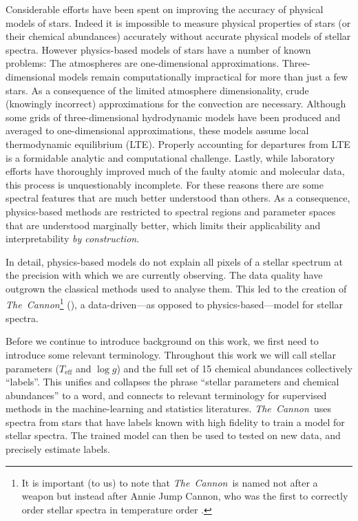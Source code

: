 \documentclass[12pt,preprint]{aastex}
\newcommand{\project}[1]{\textsl{#1}}
\newcommand{\TheCannon}{\project{The~Cannon}}
\newcommand{\logg}{\log g}
\newcommand{\Teff}{T_{\mathrm{eff}}}
\begin{document}
Considerable efforts have  been spent on improving the accuracy of physical
models of stars.  Indeed it is impossible to measure physical properties of stars (or 
their chemical abundances) accurately without accurate physical models of 
stellar spectra.  However physics-based models of stars have a number of known
problems:  The atmospheres are one-dimensional approximations.  
Three-dimensional models remain computationally impractical for more than just a
few stars.  As a consequence of the limited atmosphere dimensionality, crude 
(knowingly incorrect) approximations for the convection are 
necessary.  Although some grids of three-dimensional hydrodynamic models have been 
produced and averaged to one-dimensional approximations, these models assume 
local thermodynamic equilibrium (LTE).  Properly accounting for departures from 
LTE is a formidable analytic and computational challenge.  Lastly, while 
laboratory efforts have thoroughly improved much of the faulty atomic and 
molecular data, this process is unquestionably incomplete.  For these reasons 
there are some spectral features that are much better understood than others.  
As a consequence, physics-based methods are restricted to spectral regions and
parameter spaces that are understood marginally better, which limits 
their applicability and interpretability \emph{by construction}.


In detail, physics-based models do not explain all pixels of a stellar 
spectrum at the precision with which we are currently observing.  The data
quality have outgrown the classical methods used to analyse them.  This led to the creation of
\TheCannon\footnote{It is important (to us) to note that \TheCannon\ is named 
not after a weapon but instead after Annie Jump Cannon, who was the first to 
correctly order stellar spectra in temperature order \citep[and who did
so by looking at the data, and without any use of physics-based models, see, e.g.,][]
{Cannon_1912}.} (\citealt{tc}), a data-driven---as opposed to 
physics-based---model for stellar spectra. 


Before we continue to introduce background on this work, we first need to
introduce some relevant terminology.  Throughout this work we will call stellar 
parameters ($\Teff$ and $\logg$) and the full set of 15 chemical abundances 
collectively ``labels''.  This unifies and collapses the phrase ``stellar
parameters and chemical abundances'' to a word, and connects to relevant 
terminology for supervised methods in the machine-learning and statistics 
literatures.  \TheCannon\ uses spectra from stars that have labels known
with high fidelity to train a model for stellar spectra.  The trained model can
then be used to tested on new data, and precisely estimate labels.
\end{document}
